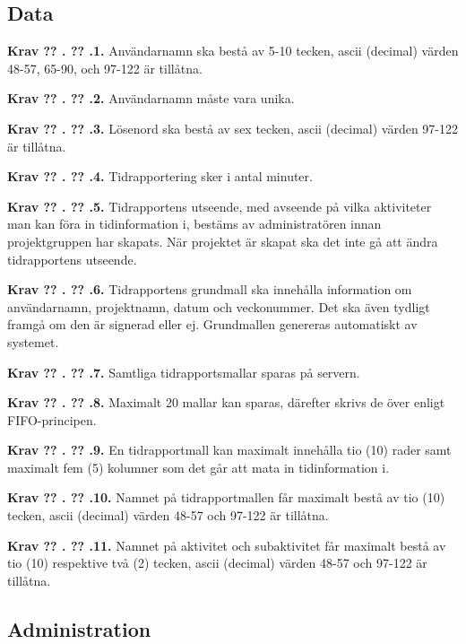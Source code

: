 \documentclass[a4paper]{article}
\newcommand\getcurrentref[1]{%
 \ifnumequal{\value{#1}}{0}
  {??}
  {\the\value{#1}}%
}
\newcommand\requirement[2]{
	\numberedrow{Krav}{#1}{#2}
}
\newcommand\numberedrow[3]{
	\noindent
	\textbf{#1 \getcurrentref{section}.\getcurrentref{subsection}.#2.} #3
	
}
\begin{document}
\subsection{Data}
\label{krav-funk-data}
\requirement{1}{Användarnamn ska bestå av 5-10 tecken, ascii (decimal) värden 48-57, 65-90, och 97-122 är tillåtna.}
\requirement{2}{Användarnamn måste vara unika.}
\requirement{3}{Lösenord ska bestå av sex tecken, ascii (decimal) värden 97-122 är tillåtna.}
\requirement{4}{Tidrapportering sker i antal minuter.}
\requirement{5}{Tidrapportens utseende, med avseende på vilka aktiviteter man kan föra in tidinformation i, bestäms av administratören innan projektgruppen har skapats. När projektet är skapat ska det inte gå att ändra tidrapportens utseende.}
\requirement{6}{Tidrapportens grundmall ska innehålla information om användarnamn, projektnamn, datum och veckonummer. Det ska även tydligt framgå om den är signerad eller ej. Grundmallen genereras automatiskt av systemet.}
\requirement{7}{Samtliga tidrapportsmallar sparas på servern.}
\requirement{8}{Maximalt 20 mallar kan sparas, därefter skrivs de över enligt FIFO-principen.}
\requirement{9}{En tidrapportmall kan maximalt innehålla tio (10) rader samt maximalt fem (5) kolumner som det går att mata in tidinformation i.}
\requirement{10}{Namnet på tidrapportmallen får maximalt bestå av tio (10) tecken, ascii (decimal) värden 48-57 och 97-122 är tillåtna.}
\requirement{11}{Namnet på aktivitet och subaktivitet får maximalt bestå av tio (10) respektive två (2) tecken, ascii (decimal) värden 48-57 och 97-122 är tillåtna.}



\subsection{Administration}
\label{krav-funk-admin}
\end{document}
